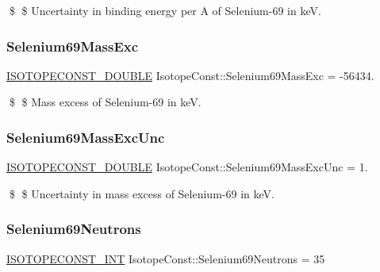 \$ \$ Uncertainty in binding energy per A of Selenium-\/69 in keV. \mbox{\label{group___isotope_const-_selenium-_se69_ga1d0c1d2368173494b11bf83bf90c67e4}} 
\subsubsection{\texorpdfstring{Selenium69\+Mass\+Exc}{Selenium69MassExc}}
{\footnotesize\ttfamily \mbox{\hyperlink{group___isotope_const-_macros_ga8f45a7272ce02c0b4c65c44636ed719a}{I\+S\+O\+T\+O\+P\+E\+C\+O\+N\+S\+T\+\_\+\+D\+O\+U\+B\+LE}} Isotope\+Const\+::\+Selenium69\+Mass\+Exc = -\/56434.}

\$ \$ Mass excess of Selenium-\/69 in keV. \mbox{\label{group___isotope_const-_selenium-_se69_gaf4c2e2ccee1c709d78928f8542347fe8}} 
\subsubsection{\texorpdfstring{Selenium69\+Mass\+Exc\+Unc}{Selenium69MassExcUnc}}
{\footnotesize\ttfamily \mbox{\hyperlink{group___isotope_const-_macros_ga8f45a7272ce02c0b4c65c44636ed719a}{I\+S\+O\+T\+O\+P\+E\+C\+O\+N\+S\+T\+\_\+\+D\+O\+U\+B\+LE}} Isotope\+Const\+::\+Selenium69\+Mass\+Exc\+Unc = 1.}

\$ \$ Uncertainty in mass excess of Selenium-\/69 in keV. \mbox{\label{group___isotope_const-_selenium-_se69_ga6ad7b8fd2483f7d843d70d641b89c21a}} 
\subsubsection{\texorpdfstring{Selenium69\+Neutrons}{Selenium69Neutrons}}
{\footnotesize\ttfamily \mbox{\hyperlink{group___isotope_const-_macros_ga5f18360b3e99483a35c32d789e62621c}{I\+S\+O\+T\+O\+P\+E\+C\+O\+N\+S\+T\+\_\+\+I\+NT}} Isotope\+Const\+::\+Selenium69\+Neutrons = 35}

